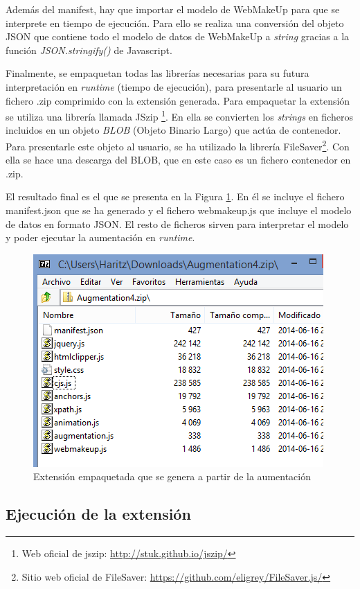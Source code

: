 Además del manifest, hay que importar el modelo de WebMakeUp para que se interprete en tiempo de ejecución. Para ello se realiza una conversión del objeto JSON que contiene todo el modelo de datos de WebMakeUp a \emph{string} gracias a la función \emph{JSON.stringify()} de Javascript.

Finalmente, se empaquetan todas las librerías necesarias para su futura interpretación en \emph{runtime} (tiempo de ejecución), para presentarle al usuario un fichero .zip comprimido con la extensión generada. Para empaquetar la extensión se utiliza una librería llamada JSzip \footnote{Web oficial de jszip: \url{http://stuk.github.io/jszip/}}. En ella se convierten los \emph{strings} en ficheros incluidos en un objeto \emph{BLOB} (Objeto Binario Largo) que actúa de contenedor. Para presentarle este objeto al usuario, se ha utilizado la librería FileSaver\footnote{Sitio web oficial de FileSaver: \url{https://github.com/eligrey/FileSaver.js/}}. Con ella se hace una descarga del BLOB, que en este caso es un fichero contenedor en .zip.

El resultado final es el que se presenta en la Figura \ref{fig:ExtensionEmpaquetada}. En él se incluye el fichero manifest.json que se ha generado y el fichero webmakeup.js que incluye el modelo de datos en formato JSON. El resto de ficheros sirven para interpretar el modelo y poder ejecutar la aumentación en \emph{runtime}.

\begin{figure}
\centering
\includegraphics[width=0.7\linewidth]{./figs/5-ExtensionEmpaquetada}
\caption{Extensión empaquetada que se genera a partir de la aumentación}
\label{fig:ExtensionEmpaquetada}
\end{figure}


\subsection{Ejecución de la extensión}
\label{sec:EjecucionExtension}

